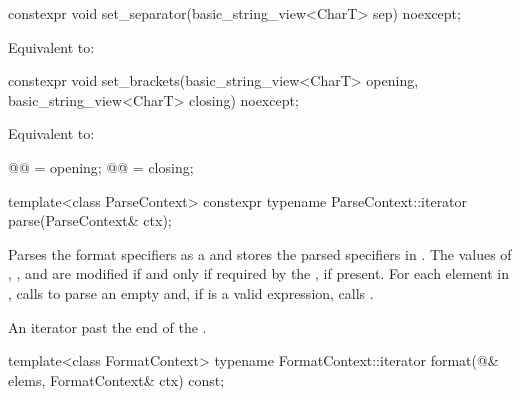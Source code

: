 %
\begin{itemdecl}
constexpr void set_separator(basic_string_view<CharT> sep) noexcept;
\end{itemdecl}

\begin{itemdescr}
\pnum
\effects
Equivalent to: 
\end{itemdescr}

%
\begin{itemdecl}
constexpr void set_brackets(basic_string_view<CharT> opening,
                            basic_string_view<CharT> closing) noexcept;
\end{itemdecl}

\begin{itemdescr}
\pnum
\effects
Equivalent to:
\begin{codeblock}
@@ = opening;
@@ = closing;
\end{codeblock}
\end{itemdescr}

%
\begin{itemdecl}
template<class ParseContext>
  constexpr typename ParseContext::iterator
    parse(ParseContext& ctx);
\end{itemdecl}

\begin{itemdescr}
\pnum
\effects
Parses the format specifiers as a  and
stores the parsed specifiers in .
The values of
,
, and
are modified if and only if
required by the , if present.
For each element  in ,
calls  to parse
an empty  and,
if  is a valid expression,
calls .

\pnum
\returns
An iterator past the end of the .
\end{itemdescr}

%
\begin{itemdecl}
template<class FormatContext>
  typename FormatContext::iterator
    format(@\seebelow@& elems, FormatContext& ctx) const;
\end{itemdecl}

